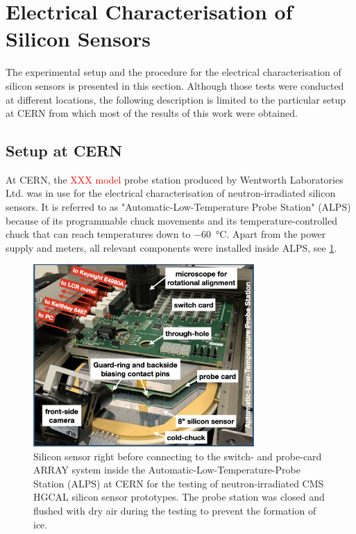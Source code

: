 \section{Electrical Characterisation of Silicon Sensors}
\label{sec:setup}
The experimental setup and the procedure for the electrical characterisation of silicon sensors is presented in this section.
Although those tests were conducted at different locations, the following description is limited to the particular setup at CERN from which most of the results of this work were obtained.

\subsection{Setup at CERN}
\label{subsec:setup_alps}
At CERN, the \textcolor{red}{XXX model} probe station produced by Wentworth Laboratories Ltd. was in use for the electrical characterisation of neutron-irradiated silicon sensors. 
It is referred to as "Automatic-Low-Temperature Probe Station" (ALPS) because of its programmable chuck movements and its temperature-controlled chuck that can reach temperatures down to \SI{-60}{\celsius}.
Apart from the power supply and meters, all relevant components were installed inside ALPS, see \ref{fig:ALPS_setup}.
\begin{figure}[h]
	\centering
	\includegraphics[width=0.75\textwidth]{figures/ALPS_photo_edit.jpeg}
	\caption{
		Silicon sensor right before connecting to the switch- and probe-card ARRAY system inside the Automatic-Low-Temperature-Probe Station (ALPS) at CERN for the testing of neutron-irradiated CMS HGCAL silicon sensor prototypes.
		The probe station was closed and flushed with dry air during the testing to prevent the formation of ice.
		}
		\label{fig:ALPS_setup}
	\end{figure}
